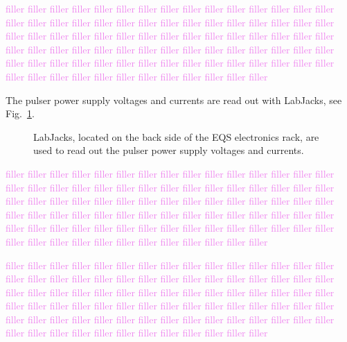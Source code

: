 \textcolor{violet}{filler filler filler filler filler filler filler filler filler filler filler filler filler filler filler filler filler filler filler filler filler filler filler filler filler filler filler filler filler filler filler filler filler filler filler filler filler filler filler filler filler filler filler filler filler filler filler filler filler filler filler filler filler filler filler filler filler filler filler filler filler filler filler filler filler filler filler filler filler filler filler filler filler filler filler filler filler filler filler filler filler filler filler filler filler filler filler}

The pulser power supply voltages and currents are read out with LabJacks, see Fig.~\ref{fig:labjack}.
\begin{figure}[]
	\centering
	\caption{LabJacks, located on the back side of the EQS electronics rack, are used to read out the pulser power supply voltages and currents.}\label{fig:labjack}
\end{figure}

\textcolor{violet}{filler filler filler filler filler filler filler filler filler filler filler filler filler filler filler filler filler filler filler filler filler filler filler filler filler filler filler filler filler filler filler filler filler filler filler filler filler filler filler filler filler filler filler filler filler filler filler filler filler filler filler filler filler filler filler filler filler filler filler filler filler filler filler filler filler filler filler filler filler filler filler filler filler filler filler filler filler filler filler filler filler filler filler filler filler filler filler}

\textcolor{violet}{filler filler filler filler filler filler filler filler filler filler filler filler filler filler filler filler filler filler filler filler filler filler filler filler filler filler filler filler filler filler filler filler filler filler filler filler filler filler filler filler filler filler filler filler filler filler filler filler filler filler filler filler filler filler filler filler filler filler filler filler filler filler filler filler filler filler filler filler filler filler filler filler filler filler filler filler filler filler filler filler filler filler filler filler filler filler filler}

